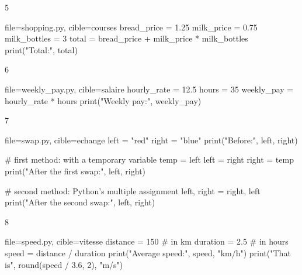 \begin{corrige}{5}
\begin{code}{file=shopping.py, cible=courses}
bread_price = 1.25
milk_price = 0.75
milk_bottles = 3
total = bread_price + milk_price * milk_bottles
print("Total:", total)
\end{code}
\end{corrige}

\begin{corrige}{6}
\begin{code}{file=weekly_pay.py, cible=salaire}
hourly_rate = 12.5
hours = 35
weekly_pay = hourly_rate * hours
print("Weekly pay:", weekly_pay)
\end{code}
\end{corrige}

\begin{corrige}{7}
\begin{code}{file=swap.py, cible=echange}
left = "red"
right = "blue"
print("Before:", left, right)

# first method: with a temporary variable
temp = left
left = right
right = temp
print("After the first swap:", left, right)

# second method: Python's multiple assignment
left, right = right, left
print("After the second swap:", left, right)
\end{code}
\end{corrige}

\begin{corrige}{8}
\begin{code}{file=speed.py, cible=vitesse}
distance = 150     # in km
duration = 2.5     # in hours
speed = distance / duration
print("Average speed:", speed, "km/h")
print("That is", round(speed / 3.6, 2), "m/s")
\end{code}
\end{corrige}

